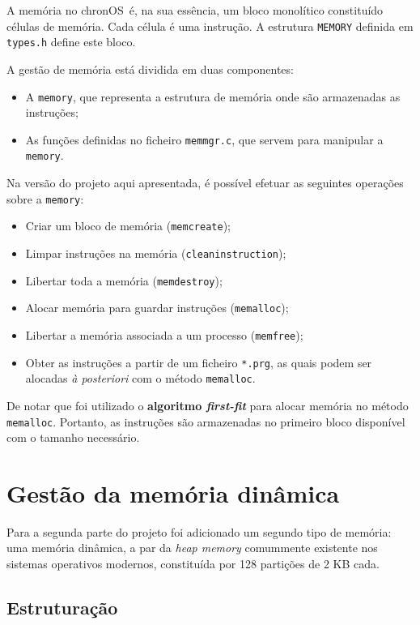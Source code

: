 \documentclass[10pt,oneside]{estiloUBI}
\newcommand{\chronOS}{\textsf{chronOS}}
\begin{document}
	A memória no \chronOS~é, na sua essência, um bloco monolítico constituído células de memória. Cada célula é uma instrução. A estrutura \verb|MEMORY| definida em \texttt{types.h} define este bloco.
	
	A gestão de memória está dividida em duas componentes:
	\begin{itemize}
		\item A \verb|memory|, que representa a estrutura de memória onde são armazenadas as instruções;
		\item As funções definidas no ficheiro \verb|memmgr.c|, que servem para manipular a \verb|memory|.
	\end{itemize}
	
	Na versão do projeto aqui apresentada, é possível efetuar as seguintes operações sobre a \verb|memory|:
	\begin{itemize}
		\item Criar um bloco de memória (\verb|memcreate|);
		\item Limpar instruções na memória (\verb|cleaninstruction|);
		\item Libertar toda a memória (\verb|memdestroy|);
		\item Alocar memória para guardar instruções (\verb|memalloc|);
		\item Libertar a memória associada a um processo (\verb|memfree|);
		\item Obter as instruções a partir de um ficheiro \verb|*.prg|, as quais podem ser alocadas \textit{à posteriori} com o método \verb|memalloc|.
	\end{itemize}
	
	De notar que foi utilizado o \textbf{algoritmo \textit{first-fit}} para alocar memória no método \verb|memalloc|. Portanto, as instruções são armazenadas no primeiro bloco disponível com o tamanho necessário.
	
	
	\chapter{Gestão da memória dinâmica}
	\label{sec:heap}
	
	Para a segunda parte do projeto foi adicionado um segundo tipo de memória: uma memória dinâmica, a par da \textit{heap memory} comummente existente nos sistemas operativos modernos, constituída por 128 partições de 2 KB cada.
	
	
	\section{Estruturação}
	\label{ssec:heap:struct}
	
\end{document}
